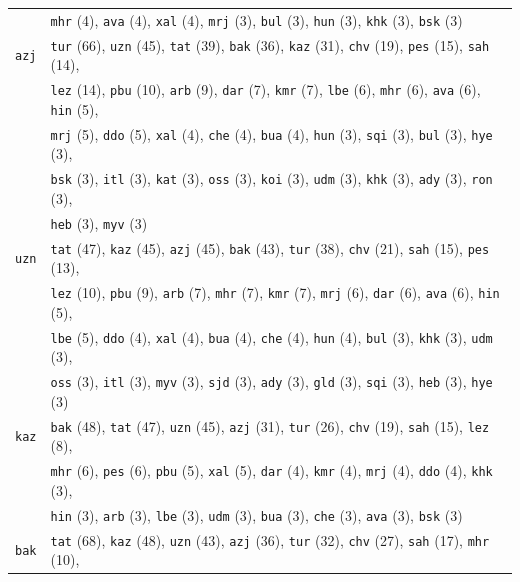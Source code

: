 \begin{center}
\begin{longtable}{ll}
 & \texttt{mhr} (4), \texttt{ava} (4), \texttt{xal} (4), \texttt{mrj} (3), \texttt{bul} (3), \texttt{hun} (3), \texttt{khk} (3), \texttt{bsk} (3) \\
\texttt{azj} & \texttt{tur} (66), \texttt{uzn} (45), \texttt{tat} (39), \texttt{bak} (36), \texttt{kaz} (31), \texttt{chv} (19), \texttt{pes} (15), \texttt{sah} (14),\\
 & \texttt{lez} (14), \texttt{pbu} (10), \texttt{arb} (9), \texttt{dar} (7), \texttt{kmr} (7), \texttt{lbe} (6), \texttt{mhr} (6), \texttt{ava} (6), \texttt{hin} (5),\\
 & \texttt{mrj} (5), \texttt{ddo} (5), \texttt{xal} (4), \texttt{che} (4), \texttt{bua} (4), \texttt{hun} (3), \texttt{sqi} (3), \texttt{bul} (3), \texttt{hye} (3),\\
 & \texttt{bsk} (3), \texttt{itl} (3), \texttt{kat} (3), \texttt{oss} (3), \texttt{koi} (3), \texttt{udm} (3), \texttt{khk} (3), \texttt{ady} (3), \texttt{ron} (3),\\
 & \texttt{heb} (3), \texttt{myv} (3) \\
\texttt{uzn} & \texttt{tat} (47), \texttt{kaz} (45), \texttt{azj} (45), \texttt{bak} (43), \texttt{tur} (38), \texttt{chv} (21), \texttt{sah} (15), \texttt{pes} (13),\\
 & \texttt{lez} (10), \texttt{pbu} (9), \texttt{arb} (7), \texttt{mhr} (7), \texttt{kmr} (7), \texttt{mrj} (6), \texttt{dar} (6), \texttt{ava} (6), \texttt{hin} (5),\\
 & \texttt{lbe} (5), \texttt{ddo} (4), \texttt{xal} (4), \texttt{bua} (4), \texttt{che} (4), \texttt{hun} (4), \texttt{bul} (3), \texttt{khk} (3), \texttt{udm} (3),\\
 & \texttt{oss} (3), \texttt{itl} (3), \texttt{myv} (3), \texttt{sjd} (3), \texttt{ady} (3), \texttt{gld} (3), \texttt{sqi} (3), \texttt{heb} (3), \texttt{hye} (3) \\
\texttt{kaz} & \texttt{bak} (48), \texttt{tat} (47), \texttt{uzn} (45), \texttt{azj} (31), \texttt{tur} (26), \texttt{chv} (19), \texttt{sah} (15), \texttt{lez} (8),\\
 & \texttt{mhr} (6), \texttt{pes} (6), \texttt{pbu} (5), \texttt{xal} (5), \texttt{dar} (4), \texttt{kmr} (4), \texttt{mrj} (4), \texttt{ddo} (4), \texttt{khk} (3),\\
 & \texttt{hin} (3), \texttt{arb} (3), \texttt{lbe} (3), \texttt{udm} (3), \texttt{bua} (3), \texttt{che} (3), \texttt{ava} (3), \texttt{bsk} (3) \\
\texttt{bak} & \texttt{tat} (68), \texttt{kaz} (48), \texttt{uzn} (43), \texttt{azj} (36), \texttt{tur} (32), \texttt{chv} (27), \texttt{sah} (17), \texttt{mhr} (10),\\

\end{longtable}
\end{center}
